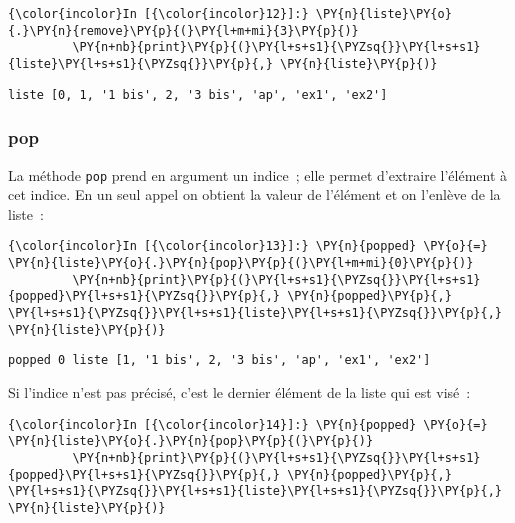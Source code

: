     \begin{Verbatim}[commandchars=\\\{\}]
{\color{incolor}In [{\color{incolor}12}]:} \PY{n}{liste}\PY{o}{.}\PY{n}{remove}\PY{p}{(}\PY{l+m+mi}{3}\PY{p}{)}
         \PY{n+nb}{print}\PY{p}{(}\PY{l+s+s1}{\PYZsq{}}\PY{l+s+s1}{liste}\PY{l+s+s1}{\PYZsq{}}\PY{p}{,} \PY{n}{liste}\PY{p}{)}
\end{Verbatim}


    \begin{Verbatim}[commandchars=\\\{\}]
liste [0, 1, '1 bis', 2, '3 bis', 'ap', 'ex1', 'ex2']

    \end{Verbatim}

    \hypertarget{pop}{%
\subsubsection{\texorpdfstring{\textbf{pop}}{pop}}\label{pop}}

    La méthode \texttt{pop} prend en argument un indice~; elle permet
d'extraire l'élément à cet indice. En un seul appel on obtient la valeur
de l'élément et on l'enlève de la liste~:

    \begin{Verbatim}[commandchars=\\\{\}]
{\color{incolor}In [{\color{incolor}13}]:} \PY{n}{popped} \PY{o}{=} \PY{n}{liste}\PY{o}{.}\PY{n}{pop}\PY{p}{(}\PY{l+m+mi}{0}\PY{p}{)}
         \PY{n+nb}{print}\PY{p}{(}\PY{l+s+s1}{\PYZsq{}}\PY{l+s+s1}{popped}\PY{l+s+s1}{\PYZsq{}}\PY{p}{,} \PY{n}{popped}\PY{p}{,} \PY{l+s+s1}{\PYZsq{}}\PY{l+s+s1}{liste}\PY{l+s+s1}{\PYZsq{}}\PY{p}{,} \PY{n}{liste}\PY{p}{)}
\end{Verbatim}


    \begin{Verbatim}[commandchars=\\\{\}]
popped 0 liste [1, '1 bis', 2, '3 bis', 'ap', 'ex1', 'ex2']

    \end{Verbatim}

    Si l'indice n'est pas précisé, c'est le dernier élément de la liste qui
est visé~:

    \begin{Verbatim}[commandchars=\\\{\}]
{\color{incolor}In [{\color{incolor}14}]:} \PY{n}{popped} \PY{o}{=} \PY{n}{liste}\PY{o}{.}\PY{n}{pop}\PY{p}{(}\PY{p}{)}
         \PY{n+nb}{print}\PY{p}{(}\PY{l+s+s1}{\PYZsq{}}\PY{l+s+s1}{popped}\PY{l+s+s1}{\PYZsq{}}\PY{p}{,} \PY{n}{popped}\PY{p}{,} \PY{l+s+s1}{\PYZsq{}}\PY{l+s+s1}{liste}\PY{l+s+s1}{\PYZsq{}}\PY{p}{,} \PY{n}{liste}\PY{p}{)}
\end{Verbatim}


